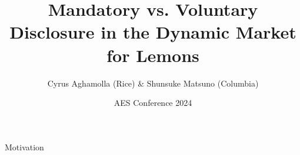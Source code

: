 \documentclass[handout, 11pt, aspectratio=169]{beamer}
\title{Mandatory vs. Voluntary Disclosure in the Dynamic Market for Lemons}
\date{AES Conference 2024}
\author{Cyrus Aghamolla (Rice) \& Shunsuke Matsuno (Columbia)}
\institute{ }
\begin{document}
\maketitle




\begin{frame}{Motivation}
    \lipsum[1]
\end{frame}
\end{document}

